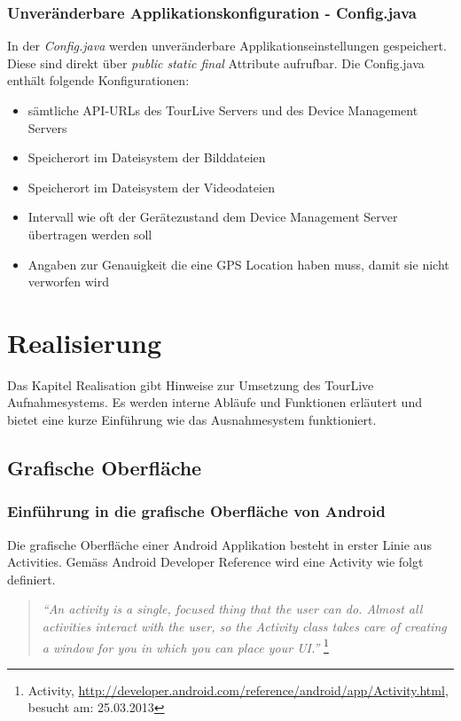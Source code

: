 \subsubsection{Unveränderbare Applikationskonfiguration - Config.java}
In der \textit{Config.java} werden unveränderbare Applikationseinstellungen gespeichert. Diese sind direkt über \textit{public static final} Attribute aufrufbar. Die Config.java enthält folgende Konfigurationen:
\begin{itemize} [noitemsep,topsep=0pt]
	\item sämtliche API-URLs des TourLive Servers und des Device Management Servers
	\item Speicherort im Dateisystem der Bilddateien
	\item Speicherort im Dateisystem der Videodateien
	\item Intervall wie oft der Gerätezustand dem Device Management Server übertragen werden soll
	\item Angaben zur Genauigkeit die eine GPS Location haben muss, damit sie nicht verworfen wird
\end{itemize}

\section{Realisierung}
Das Kapitel Realisation gibt Hinweise zur Umsetzung des TourLive Aufnahmesystems. Es werden interne Abläufe und Funktionen erläutert und bietet eine kurze Einführung wie das Ausnahmesystem funktioniert. 

\subsection{Grafische Oberfläche}
\subsubsection{Einführung in die grafische Oberfläche von Android}

Die grafische Oberfläche einer Android Applikation besteht in erster Linie aus Activities. Gemäss Android Developer Reference wird eine Activity wie folgt definiert.

\begin{quotation}
\textit{``An activity is a single, focused thing that the user can do. Almost all activities interact with the user, so the Activity class takes care of creating a window for you in which you can place your UI.''} \footnote{Activity, \url{http://developer.android.com/reference/android/app/Activity.html}, besucht am: 25.03.2013}
\end{quotation}

